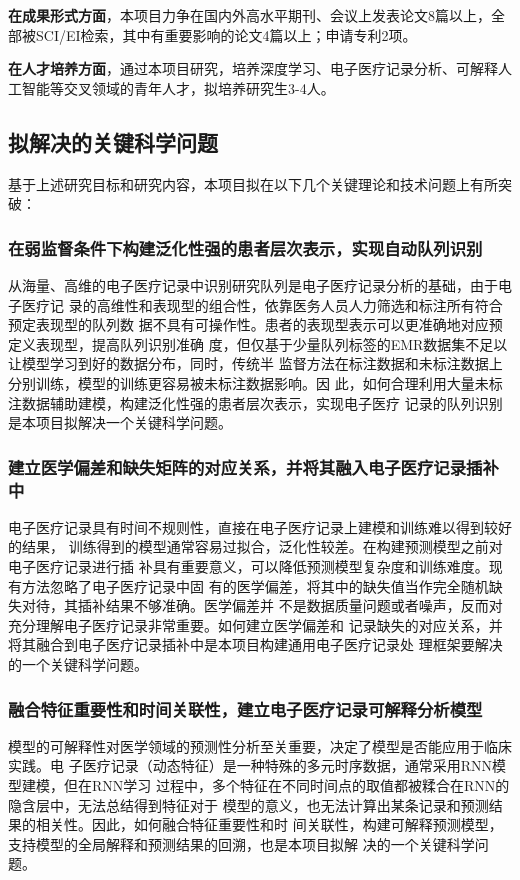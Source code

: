 \textbf{在成果形式方面}，本项目力争在国内外高水平期刊、会议上发表论文8篇以上，全
部被SCI/EI检索，其中有重要影响的论文4篇以上；申请专利2项。

\textbf{在人才培养方面}，通过本项目研究，培养深度学习、电子医疗记录分析、可解释人工智能等交叉领域的青年人才，拟培养研究生3-4人。

\subsection{拟解决的关键科学问题}

基于上述研究目标和研究内容，本项目拟在以下几个关键理论和技术问题上有所突破：

\subsubsection{在弱监督条件下构建泛化性强的患者层次表示，实现自动队列识别}

从海量、高维的电子医疗记录中识别研究队列是电子医疗记录分析的基础，由于电子医疗记
录的高维性和表现型的组合性，依靠医务人员人力筛选和标注所有符合预定表现型的队列数
据不具有可操作性。患者的表现型表示可以更准确地对应预定义表现型，提高队列识别准确
度，但仅基于少量队列标签的EMR数据集不足以让模型学习到好的数据分布，同时，传统半
监督方法在标注数据和未标注数据上分别训练，模型的训练更容易被未标注数据影响。因
此，如何合理利用大量未标注数据辅助建模，构建泛化性强的患者层次表示，实现电子医疗
记录的队列识别是本项目拟解决一个关键科学问题。

\subsubsection{建立医学偏差和缺失矩阵的对应关系，并将其融入电子医疗记录插补中}

电子医疗记录具有时间不规则性，直接在电子医疗记录上建模和训练难以得到较好的结果，
训练得到的模型通常容易过拟合，泛化性较差。在构建预测模型之前对电子医疗记录进行插
补具有重要意义，可以降低预测模型复杂度和训练难度。现有方法忽略了电子医疗记录中固
有的医学偏差，将其中的缺失值当作完全随机缺失对待，其插补结果不够准确。医学偏差并
不是数据质量问题或者噪声，反而对充分理解电子医疗记录非常重要。如何建立医学偏差和
记录缺失的对应关系，并将其融合到电子医疗记录插补中是本项目构建通用电子医疗记录处
理框架要解决的一个关键科学问题。

\subsubsection{融合特征重要性和时间关联性，建立电子医疗记录可解释分析模型}

模型的可解释性对医学领域的预测性分析至关重要，决定了模型是否能应用于临床实践。电
子医疗记录（动态特征）是一种特殊的多元时序数据，通常采用RNN模型建模，但在RNN学习
过程中，多个特征在不同时间点的取值都被糅合在RNN的隐含层中，无法总结得到特征对于
模型的意义，也无法计算出某条记录和预测结果的相关性。因此，如何融合特征重要性和时
间关联性，构建可解释预测模型，支持模型的全局解释和预测结果的回溯，也是本项目拟解
决的一个关键科学问题。